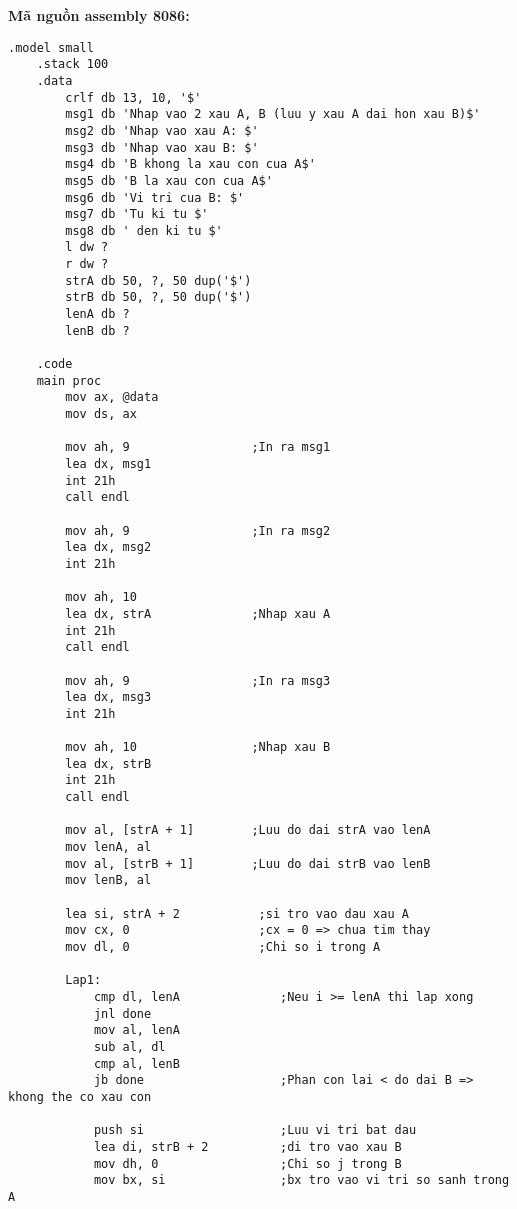 \vspace{0.5cm}
\noindent\textbf{\large Mã nguồn assembly 8086:}
\begin{lstlisting}[style=asm, caption={Mã nguồn câu 3}]
    .model small
    .stack 100
    .data
        crlf db 13, 10, '$'      
        msg1 db 'Nhap vao 2 xau A, B (luu y xau A dai hon xau B)$'
        msg2 db 'Nhap vao xau A: $'
        msg3 db 'Nhap vao xau B: $'
        msg4 db 'B khong la xau con cua A$'      
        msg5 db 'B la xau con cua A$'
        msg6 db 'Vi tri cua B: $'    
        msg7 db 'Tu ki tu $'
        msg8 db ' den ki tu $'
        l dw ?
        r dw ?
        strA db 50, ?, 50 dup('$')
        strB db 50, ?, 50 dup('$')
        lenA db ?
        lenB db ?
    
    .code
    main proc
        mov ax, @data
        mov ds, ax
    
        mov ah, 9                 ;In ra msg1
        lea dx, msg1
        int 21h
        call endl
    
        mov ah, 9                 ;In ra msg2
        lea dx, msg2
        int 21h    
        
        mov ah, 10
        lea dx, strA              ;Nhap xau A
        int 21h
        call endl
    
        mov ah, 9                 ;In ra msg3
        lea dx, msg3
        int 21h      
        
        mov ah, 10                ;Nhap xau B
        lea dx, strB
        int 21h
        call endl
    
        mov al, [strA + 1]        ;Luu do dai strA vao lenA
        mov lenA, al
        mov al, [strB + 1]        ;Luu do dai strB vao lenB
        mov lenB, al                          
        
        lea si, strA + 2           ;si tro vao dau xau A
        mov cx, 0                  ;cx = 0 => chua tim thay
        mov dl, 0                  ;Chi so i trong A
    
        Lap1:
            cmp dl, lenA              ;Neu i >= lenA thi lap xong
            jnl done                   
            mov al, lenA              
            sub al, dl
            cmp al, lenB
            jb done                   ;Phan con lai < do dai B => khong the co xau con
        
            push si                   ;Luu vi tri bat dau
            lea di, strB + 2          ;di tro vao xau B
            mov dh, 0                 ;Chi so j trong B
            mov bx, si                ;bx tro vao vi tri so sanh trong A
        

\end{lstlisting}
